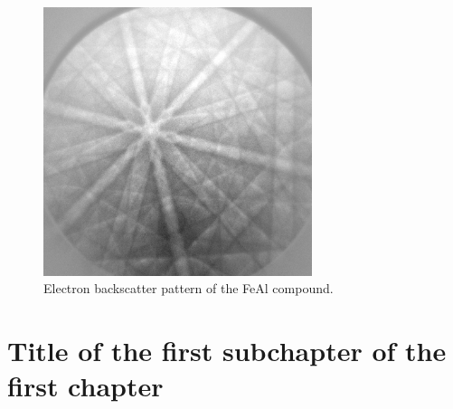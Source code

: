 \begin{figure}
	\centering
	\includegraphics[width=0.7\textwidth]{img/INITIAL_x0y0}
	\caption{Electron backscatter pattern of the FeAl compound.}
	\label{ebsp-example}
\end{figure}


\section{Title of the first subchapter of the first chapter}

